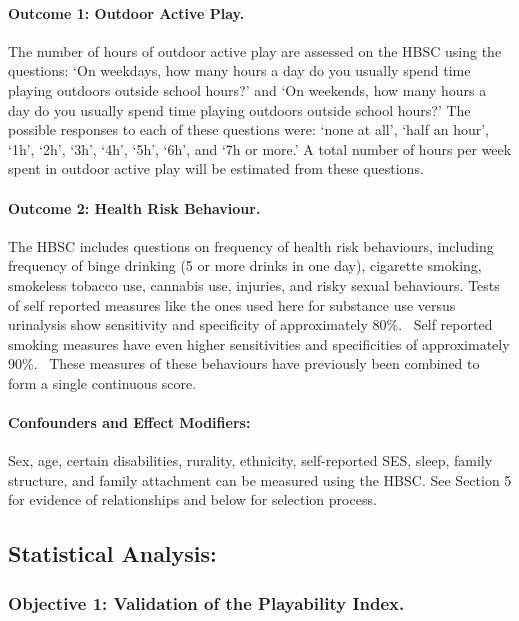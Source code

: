 \documentclass [11pt]{article}
\begin{document}
\paragraph{Outcome 1: Outdoor Active Play.} The number of hours of outdoor active play are assessed on the HBSC using the questions: `On weekdays, how many hours a day do you usually spend time playing outdoors outside school hours?' and `On weekends, how many hours a day do you usually spend time playing outdoors outside school hours?' The possible responses to each of these questions were: `none at all', `half an hour', `1h', `2h', `3h', `4h', `5h', `6h', and `7h or more.' A total number of hours per week spent in outdoor active play will be estimated from these questions. 

\paragraph{Outcome 2: Health Risk Behaviour.} The HBSC includes questions on frequency of health risk behaviours, including frequency of binge drinking (5 or more drinks in one day), cigarette smoking, smokeless tobacco use, cannabis use, injuries, and risky sexual behaviours. Tests of self reported measures like the ones used here for substance use versus urinalysis show sensitivity and specificity of approximately 80\%.~\cite{Akinci2001-nd,Murphy2000-fy,Brener2003-ps} Self reported smoking measures have even higher sensitivities and specificities of approximately 90\%.~\cite{Post2005-yw} These measures of these behaviours have previously been combined to form a single continuous score.~\cite{Kwong2017-oe} 

\paragraph{Confounders and Effect Modifiers:} Sex, age, certain disabilities, rurality, ethnicity, self-reported SES, sleep, family structure, and family attachment can be measured using the HBSC. See Section 5 for evidence of relationships and below for selection process. 

\subsection{Statistical Analysis:} 

\subsubsection{Objective 1: Validation of the Playability Index.}
\end{document}
